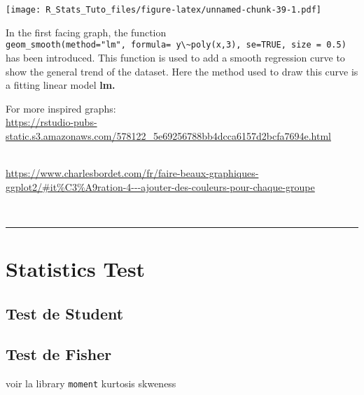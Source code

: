 \documentclass[
]{article}
\begin{document}
\texttt{[image: R\_Stats\_Tuto\_files/figure-latex/unnamed-chunk-39-1.pdf]}

In the first facing graph, the function
\texttt{geom\_smooth(method="lm",\ formula=\ y\textbackslash{}\textasciitilde{}poly(x,3),\ se=TRUE,\ size\ =\ 0.5)}
has been introduced. This function is used to add a smooth regression
curve to show the general trend of the dataset. Here the method used to
draw this curve is a fitting linear model \textbf{lm.}

For more inspired graphs:\\
\url{https://rstudio-pubs-static.s3.amazonaws.com/578122_5e69256788bb4dcca6157d2bcfa7694e.html}\strut \\
\url{https://www.charlesbordet.com/fr/faire-beaux-graphiques-ggplot2/\#it\%C3\%A9ration-4---ajouter-des-couleurs-pour-chaque-groupe}\strut \\

\begin{center}\rule{0.5\linewidth}{0.5pt}\end{center}

\hypertarget{statistics-test}{%
\section{Statistics Test}\label{statistics-test}}

\hypertarget{test-de-student}{%
\subsection{\texorpdfstring{Test de
\textbf{Student}}{Test de Student}}\label{test-de-student}}

\hypertarget{test-de-fisher}{%
\subsection{\texorpdfstring{Test de
\textbf{Fisher}}{Test de Fisher}}\label{test-de-fisher}}

voir la library \texttt{moment} kurtosis skweness
\end{document}
